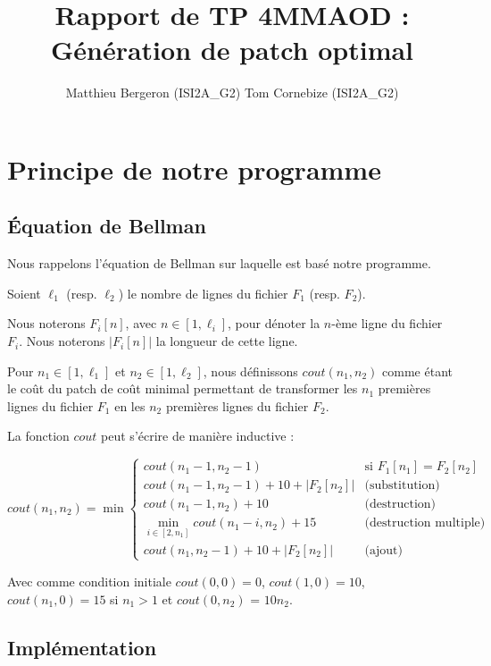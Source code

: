\documentclass[a4paper, 10pt, french]{article}
\title{Rapport de TP 4MMAOD : Génération de patch optimal}
\author{
Matthieu Bergeron (ISI2A\_G2)
Tom Cornebize (ISI2A\_G2)
}
\newcommand{\abs}[1]{\left| #1 \right|}
\begin{document}
\maketitle

\section{Principe de notre  programme}

\subsection{Équation de Bellman}

Nous rappelons l'équation de Bellman sur laquelle est basé notre programme.

Soient $\ell_1$ (resp. $\ell_2$) le nombre de lignes du fichier $F_1$ (resp. $F_2$).

Nous noterons $F_i[n]$, avec $n \in [1, \ell_i]$, pour dénoter la $n$-ème ligne du fichier
$F_i$. Nous noterons $\abs{F_i[n]}$ la longueur de cette ligne.

Pour $n_1 \in [1, \ell_1]$ et $n_2 \in [1, \ell_2]$, nous définissons $cout(n_1, n_2)$
comme étant le coût du patch de coût minimal permettant de transformer les $n_1$
premières lignes du fichier $F_1$ en les $n_2$ premières lignes du fichier $F_2$.

La fonction $cout$ peut s'écrire de manière inductive :

\[
    cout(n_1, n_2) = \min
    \begin{cases}
        cout(n_1-1, n_2-1)                          & \text{si } F_1[n_1] = F_2[n_2]\\
        cout(n_1-1, n_2-1) + 10 + \abs{F_2[n_2]}    & \text{(substitution)}\\
        cout(n_1-1, n_2) + 10                       & \text{(destruction)}\\
        \min_{i \in [2, n_1]} cout(n_1-i, n_2) + 15          & \text{(destruction multiple)}\\
        cout(n_1, n_2-1) + 10 + \abs{F_2[n_2]}      & \text{(ajout)}
    \end{cases}
\]

Avec comme condition initiale $cout(0, 0) = 0$, $cout(1, 0) = 10$, $cout(n_1, 0) = 15$
si $n_1 > 1$ et $cout(0, n_2)$ = $10n_2$.

\subsection{Implémentation}
\end{document}
